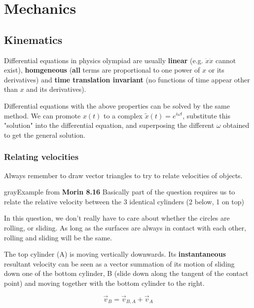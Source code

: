\chapter{Mechanics}
\section{Kinematics}
Differential equations in physics olympiad are usually \textbf{linear} (e.g. $\dot{x} \ddot{x}$ cannot exist), \textbf{homgeneous} (\textbf{all} terms are proportional to one power of $x$ or its derivatives) and \textbf{time translation invariant} (no functions of time appear other than $x$ and its derivatives).

Differential equations with the above properties can be solved by the same method. We can promote $x(t)$ to a complex $\tilde{x}(t)=e^{i\omega t}$, substitute this "solution" into the differential equation, and superposing the different $\omega$ obtained to get the general solution.

\subsection{Relating velocities}
Always remember to draw vector triangles to try to relate velocities of objects.
\begin{mybox}{gray}{Example from \textbf{Morin 8.16}}
    Basically part of the question requires us to relate the relative velocity between the 3 identical cylinders (2 below, 1 on top)
    \begin{flushleft}
        In this question, we don't really have to care about whether the circles are rolling, or sliding. As long as the surfaces are always in contact with each other, rolling and sliding will be the same.
    \end{flushleft}
    \begin{flushleft}
        The top cylinder (A) is moving vertically downwards. Its \textbf{instantaneous} resultant velocity can be seen as a vector summation of its motion of sliding down one of the bottom cylinder, B (slide down along the tangent of the contact point) and moving together with the bottom cylinder to the right.
    \end{flushleft}
    \begin{equation}
        \vec{v}_B=\vec{v}_{B,A}+\vec{v}_A
    \end{equation}
\end{mybox}

